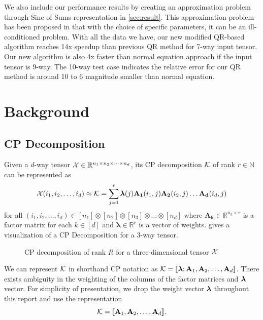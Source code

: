 \documentclass{article}
\newcommand{\mat}[1]{\mathbf{#1}}
\newcommand{\V}[2][]{\bm{#1{\mathbf{\MakeLowercase{#2}}}}} 		%
\newcommand{\T}[2][]{#1{\mathbf{\cal{#2}}}} 						%
\begin{document}
We also include our performance results by creating an approximation problem through Sine of Sums representation in \cref{sec:result}.
This approximation problem has been proposed in \cite{BM02} that with the choice of specific parameters, it can be an ill-conditioned problem.
With all the data we have, our new modified QR-based algorithm reaches 14x speedup than previous QR method for 7-way input tensor.
Our new algorithm is also 4x faster than normal equation approach if the input tensor is 9-way.
The 10-way test case indicates the relative error for our QR method is around 10 to 6 magnitude smaller than normal equation.



\section{Background} 
\label{sec:background}

\subsection{CP Decomposition}
Given a $d$-way tensor $\T{X} \in \mathbb{R}^{n_1\times n_2\times \dots \times n_d}$, its
CP decomposition $\T{K}$ of rank $r \in \mathbb{N}$ can be represented as 
\begin{equation}
\label{eq:CP}
\T{X}(i_1,i_2,\dots, i_d) \approx \T{K} = \sum^{r}_{j=1} \V{\lambda}(j) \mat{A_1}(i_1,j)\mat{A_2}(i_2,j) \dots \mat{A_d}(i_d,j)
\end{equation}
for all $(i_1,i_2,\dots, i_d) \in [n_1] \otimes [n_2] \otimes [n_3] \otimes \dots \otimes [n_d]$ where $\mat{A_k} \in \mathbb{R}^{n_k \times r}$ is a factor matrix for each $k \in [d]$ and $\bm{\lambda}\in\mathbb{R}^r$ is a vector of weights. 
 gives a visualization of a CP Decomposition for a 3-way tensor.

\begin{figure}[ht!]
\centering

\caption{CP decomposition of rank $R$ for a three-dimensional tensor $\T{X}$ \label{fig:3d-cp-decomp}}
\end{figure}
We can represent $\T[]{K}$ in shorthand CP notation as $\T{K} = [\![\V{\lambda};\mat{A}_1,\mat{A}_2, \dots,\mat{A}_d ]\!]$. 
There exists ambiguity in the weighting of the columns of the factor matrices and $\V{\lambda}$ vector.
For simplicity of presentation, we drop the weight vector $\V{\lambda}$ throughout this report and use the representation
$$\T{K} = [\![\mat{A}_1,\mat{A}_2, \dots,\mat{A}_d ]\!].$$
\end{document}

